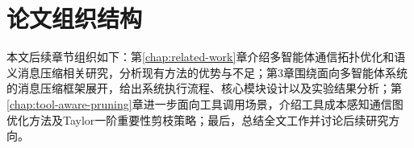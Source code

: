 \section{论文组织结构}

本文后续章节组织如下：第\ref{chap:related-work}章介绍多智能体通信拓扑优化和语义消息压缩相关研究，分析现有方法的优势与不足；第3章围绕面向多智能体系统的消息压缩框架展开，给出系统执行流程、核心模块设计以及实验结果分析；第\ref{chap:tool-aware-pruning}章进一步面向工具调用场景，介绍工具成本感知通信图优化方法及Taylor一阶重要性剪枝策略；最后，总结全文工作并讨论后续研究方向。
